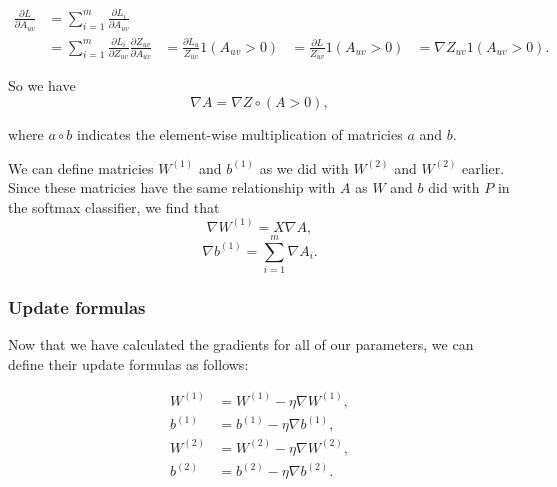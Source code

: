 \begin{align*}
  \frac{\partial L}{\partial A_{uv}}
  &= \sum_{i=1}^m \frac{\partial L_i}{\partial A_{uv}}\\
  &= \sum_{i=1}^m \frac{\partial L_i}{\partial Z_{uv}} \frac{\partial Z_{uv}}{\partial A_{uv}}
  &= \frac{\partial L_u}{Z_{uv}} 1(A_{uv} > 0)
  &= \frac{\partial L}{Z_{uv}} 1(A_{uv} > 0)
  &= \nabla Z_{uv} 1(A_{uv} > 0).
\end{align*}

So we have
$$ \nabla A = \nabla Z \circ (A > 0), $$

where $a \circ b$ indicates the element-wise multiplication of matricies $a$ and $b$.

We can define matricies $W^{(1)}$ and $b^{(1)}$ as we did with $W^{(2)}$ and
$W^{(2)}$ earlier. Since these matricies have the same relationship with $A$ as
$W$ and $b$ did with $P$ in the softmax classifier, we find that
$$ \nabla W^{(1)} = X \nabla A, $$
$$ \nabla b^{(1)} = \sum_{i=1}^m \nabla A_i.$$

\subsubsection{Update formulas}
Now that we have calculated the gradients for all of our parameters, we can
define their update formulas as follows:

\begin{align*}
W^{(1)} &= W^{(1)} - \eta \nabla W^{(1)},\\
b^{(1)} &= b^{(1)} - \eta \nabla b^{(1)},\\
W^{(2)} &= W^{(2)} - \eta \nabla W^{(2)},\\
b^{(2)} &= b^{(2)} - \eta \nabla b^{(2)}.
\end{align*}
